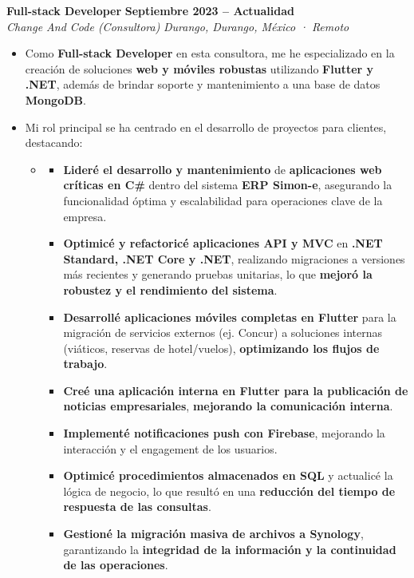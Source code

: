 \documentclass[11pt]{article}
\begin{document}
\textbf{Full-stack Developer} \hfill \textbf{Septiembre 2023 – Actualidad}\\
\textit{Change And Code (Consultora)} \hfill \textit{Durango, Durango, México · Remoto}\\
\begin{itemize}
    \item Como \textbf{Full-stack Developer} en esta consultora, me he especializado en la creación de soluciones \textbf{web y móviles robustas} utilizando \textbf{Flutter y .NET}, además de brindar soporte y mantenimiento a una base de datos \textbf{MongoDB}.
    \item Mi rol principal se ha centrado en el desarrollo de proyectos para clientes, destacando:
    \begin{itemize}
        \item \textbf{\color{reddark}{Proyecto para Tenco Integración de Sistemas:}}
        \begin{itemize}
            \item \textbf{Lideré el desarrollo y mantenimiento} de \textbf{aplicaciones web críticas en C\#} dentro del sistema \textbf{ERP Simon-e}, asegurando la funcionalidad óptima y escalabilidad para operaciones clave de la empresa.
            \item \textbf{Optimicé y refactoricé aplicaciones API y MVC} en \textbf{.NET Standard, .NET Core y .NET}, realizando migraciones a versiones más recientes y generando pruebas unitarias, lo que \textbf{mejoró la robustez y el rendimiento del sistema}.
            \item \textbf{Desarrollé aplicaciones móviles completas en Flutter} para la migración de servicios externos (ej. Concur) a soluciones internas (viáticos, reservas de hotel/vuelos), \textbf{optimizando los flujos de trabajo}.
            \item \textbf{Creé una aplicación interna en Flutter para la publicación de noticias empresariales}, \textbf{mejorando la comunicación interna}.
            \item \textbf{Implementé notificaciones push con Firebase}, mejorando la interacción y el engagement de los usuarios.
            \item \textbf{Optimicé procedimientos almacenados en SQL} y actualicé la lógica de negocio, lo que resultó en una \textbf{reducción del tiempo de respuesta de las consultas}.
            \item \textbf{Gestioné la migración masiva de archivos a Synology}, garantizando la \textbf{integridad de la información y la continuidad de las operaciones}.

\end{itemize}
\end{itemize}
\end{itemize}
\end{document}
